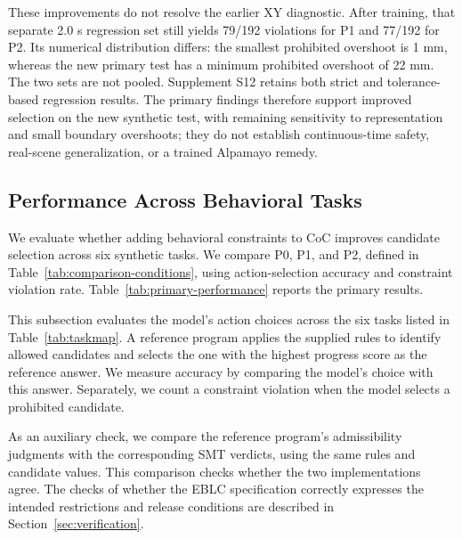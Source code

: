 \documentclass[nolineno]{ieeeaccess}
\begin{document}
These improvements do not resolve the earlier XY diagnostic. After training, that separate 2.0 s regression set still yields 79/192 violations for P1 and 77/192 for P2. Its numerical distribution differs: the smallest prohibited overshoot is 1 mm, whereas the new primary test has a minimum prohibited overshoot of 22 mm. The two sets are not pooled. Supplement S12 retains both strict and tolerance-based regression results. The primary findings therefore support improved selection on the new synthetic test, with remaining sensitivity to representation and small boundary overshoots; they do not establish continuous-time safety, real-scene generalization, or a trained Alpamayo remedy.\par

\subsection{Performance Across Behavioral Tasks}

We evaluate whether adding behavioral constraints to CoC improves candidate selection across six synthetic tasks. We compare P0, P1, and P2, defined in Table~\ref{tab:comparison-conditions}, using action-selection accuracy and constraint violation rate. Table~\ref{tab:primary-performance} reports the primary results.\par

This subsection evaluates the model’s action choices across the six tasks listed in Table~\ref{tab:taskmap}. A reference program applies the supplied rules to identify allowed candidates and selects the one with the highest progress score as the reference answer. We measure accuracy by comparing the model’s choice with this answer. Separately, we count a constraint violation when the model selects a prohibited candidate.\par

As an auxiliary check, we compare the reference program’s admissibility judgments with the corresponding SMT verdicts, using the same rules and candidate values. This comparison checks whether the two implementations agree. The checks of whether the EBLC specification correctly expresses the intended restrictions and release conditions are described in Section~\ref{sec:verification}.\par
\end{document}
